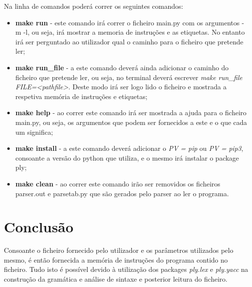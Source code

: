 \documentclass[titlepage,11pt,svgnames]{article}   %
\begin{document}
Na linha de comandos poderá correr os seguintes comandos:

\begin{itemize}
\item \textbf{make run} - este comando irá correr o ficheiro main.py com os argumentos -m -l, ou seja, irá mostrar a memoria de instruções e as etiquetas. No entanto irá ser perguntado ao utilizador qual o caminho para o ficheiro que pretende ler;
\item \textbf{make run\_file} - a este comando deverá ainda adicionar o caminho do ficheiro que pretende ler, ou seja, no terminal deverá escrever \textit{make run\_file FILE=<pathfile>}. Deste modo irá ser logo lido o ficheiro e mostrada a respetiva memória de instruções e etiquetas;
\item \textbf{make help} - ao correr este comando irá ser mostrada a ajuda para o ficheiro main.py, ou seja, os argumentos que podem ser fornecidos a este e o que cada um significa;
\item \textbf{make install} - a este comando deverá adicionar o \textit{PV = pip} ou \textit{PV = pip3}, consoante a versão do python que utiliza, e o mesmo irá instalar o package ply;
\item \textbf{make clean} - ao correr este comando irão ser removidos os ficheiros parser.out  e parsetab.py que são gerados pelo parser ao ler o programa.
\end{itemize}

\pagebreak
\section{Conclusão}

Consoante o ficheiro fornecido pelo utilizador e os parâmetros utilizados pelo mesmo, é então fornecida a memória de instruções do programa contido no ficheiro. Tudo isto é possível devido à utilização dos packages \textit{ply.lex} e \textit{ply.yacc} na construção da gramática e análise de sintaxe e posterior leitura do ficheiro.
\end{document}
